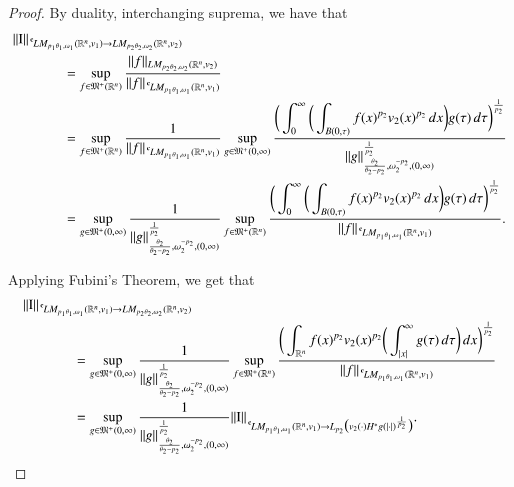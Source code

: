 \documentclass[11pt]{amsart}
\theoremstyle{plain}
\theoremstyle{definition}
\numberwithin{thm}{section}
\numberwithin{equation}{section}
\begin{document}
\begin{proof}
	By duality, interchanging suprema, we have that
	\begin{align*}
	\|{\operatorname{I}}\|_{{\,^{^{\bf c}}\!} LM_{p_1{\theta}_1,{\omega}_1}({{\mathbb R}^n},v_1){\rightarrow} LM_{p_2{\theta}_2,{\omega}_2}({{\mathbb R}^n},v_2)} & \\
	& \hspace{-3cm} =\sup_{f\in {\mathfrak M}^+({{\mathbb R}^n})} {\frac{\displaystyle {\|f\|_{LM_{p_2{\theta}_2,{\omega}_2}({{\mathbb R}^n},v_2)}}}{\displaystyle {\|f\|_{{\,^{^{\bf c}}\!} LM_{p_1{\theta}_1,{\omega}_1}({{\mathbb R}^n},v_1)}}}} \\
	& \hspace{-3cm} = \sup_{f\in {\mathfrak M}^+({{\mathbb R}^n})} {\frac{\displaystyle {1}}{\displaystyle {\|f\|_{{\,^{^{\bf c}}\!} LM_{p_1{\theta}_1,{\omega}_1}({{\mathbb R}^n},v_1)}}}} \sup_{g\in {\mathfrak M}^+{(0,{\infty})}} {\frac{\displaystyle {\bigg(\int_0^\infty \bigg(\int_{B(0,\tau)} f(x)^{p_2}  v_2(x)^{p_2} \, dx \bigg) g(\tau)\,d\tau\bigg)^{\frac{1}{p_2}}}}{\displaystyle {\|g\|_{\frac{{\theta}_2}{{\theta}_2-p_2},{\omega}_2^{-p_2},(0,\infty)}^{\frac{1}{p_2}}}}}\\
	& \hspace{-3cm} = \sup_{g\in {\mathfrak M}^+{(0,{\infty})}} {\frac{\displaystyle {1}}{\displaystyle {\|g\|_{\frac{{\theta}_2}{{\theta}_2-p_2},{\omega}_2^{-p_2},(0,\infty)}^{\frac{1}{p_2}}}}} \sup_{f\in {\mathfrak M}^+({{\mathbb R}^n})} {\frac{\displaystyle {\bigg(\int_0^\infty \bigg(\int_{B(0,\tau)} f(x)^{p_2} v_2(x)^{p_2} \,dx\bigg)  g(\tau) \,d\tau\bigg)^{\frac{1}{p_2}}}}{\displaystyle {\|f\|_{{\,^{^{\bf c}}\!} LM_{p_1{\theta}_1,{\omega}_1}({{\mathbb R}^n},v_1)}}}}.
	\end{align*}
	
	Applying Fubini's Theorem, we get that
	\begin{align}
	\|{\operatorname{I}}\|_{{\,^{^{\bf c}}\!} LM_{p_1{\theta}_1,{\omega}_1}({{\mathbb R}^n},v_1){\rightarrow} LM_{p_2{\theta}_2,{\omega}_2}({{\mathbb R}^n},v_2)} & \notag \\
	& \hspace{-3cm} = \sup_{g\in {\mathfrak M}^+{(0,{\infty})}} {\frac{\displaystyle {1}}{\displaystyle {\|g\|_{\frac{{\theta}_2}{{\theta}_2-p_2},{\omega}_2^{-p_2},(0,\infty)}^{\frac{1}{p_2}}}}} \sup_{f\in {\mathfrak M}^+({{\mathbb R}^n})} {\frac{\displaystyle {\bigg(\int_{{\mathbb R}^n} f(x)^{p_2} v_2(x)^{p_2} \bigg(\int_{|x|}^{\infty} g(\tau) \,d\tau \bigg)\, dx \bigg)^{\frac{1}{p_2}}}}{\displaystyle {\|f\|_{{\,^{^{\bf c}}\!} LM_{p_1{\theta}_1,{\omega}_1}({{\mathbb R}^n},v_1)}}}}\notag\\
	& \hspace{-3cm} = \sup_{g\in {\mathfrak M}^+{(0,{\infty})}} {\frac{\displaystyle {1}}{\displaystyle {\|g\|_{\frac{{\theta}_2}{{\theta}_2-p_2},{\omega}_2^{-p_2},(0,\infty)}^{\frac{1}{p_2}}}}} \|{\operatorname{I}}\|_{{\,^{^{\bf c}}\!} LM_{p_1{\theta}_1,{\omega}_1}({{\mathbb R}^n},v_1){\rightarrow} L_{p_2}\big(v_2(\cdot)H^*g(|\cdot|)^{\frac{1}{p_2}}\big)}. \label{GommeninIlkDenkligi}
	\end{align}
\end{proof}
\end{document}
